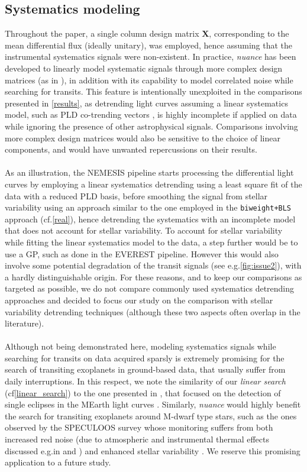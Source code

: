 \documentclass{aastex631}
\newcommand{\nuancemethod}{\textit{nuance}}
\begin{document}
\subsection{Systematics modeling}
Throughout the paper, a single column design matrix $\bm{X}$, corresponding to the mean differential flux (ideally unitary), was employed, hence assuming that the instrumental systematics signals were non-existent. In practice, \nuancemethod{} has been developed to linearly model systematic signals through more complex design matrices (as in \citealt{foreman2016}), in addition with its capability to model correlated noise while searching for transits. This feature is intentionally unexploited in the comparisons presented in \autoref{results}, as detrending light curves assuming a linear systematics model, such as PLD co-trending vectors \citep{pld}, is highly incomplete if applied on data while ignoring the presence of other astrophysical signals. Comparisons involving more complex design matrices would also be sensitive to the choice of linear components, and would have unwanted repercussions on their results.\\\\
As an illustration, the NEMESIS pipeline \citep{nemesis} starts processing the differential light curves by employing a linear systematics detrending using a least square fit of the data with a reduced PLD basis, before smoothing the signal from stellar variability using an approach similar to the one employed in the \texttt{biweight+BLS} approach (cf.\;\autoref{real}), hence detrending the systematics with an incomplete model that does not account for stellar variability. To account for stellar variability while fitting the linear systematics model to the data, a step further would be to use a GP, such as done in the EVEREST \citep{everest2} pipeline. However this would also involve some potential degradation of the transit signals (see e.g.\;\autoref{fig:issue2}), with a hardly distinguishable origin. For these reasons, and to keep our comparisons as targeted as possible, we do not compare commonly used systematics detrending approaches and decided to focus our study on the comparison with stellar variability detrending techniques (although these two aspects often overlap in the literature).\\\\
Although not being demonstrated here, modeling systematics signals while searching for transits on data acquired sparsly is extremely promising for the search of transiting exoplanets in ground-based data, that usually suffer from daily interruptions. In this respect, we note the similarity of our \textit{linear search} (cf\;\autoref{linear_search}) to the one presented in \citealt{Berta2012}, that focused on the detection of single eclipses in the MEarth light curves \citep{Irwin2009}. Similarly, \nuancemethod{} would highly benefit the search for transiting exoplanets around M-dwarf type stars, such as the ones observed by the SPECULOOS survey \citep{speculoos} whose monitoring suffers from both increased red noise (due to atmospheric and instrumental thermal effects discussed e.g.\;in \citealt{Berta2012} and  \citealt{Pedersen2023}) and enhanced stellar variability \citep{Murray2020}. We reserve this promising application to a future study.
\end{document}
